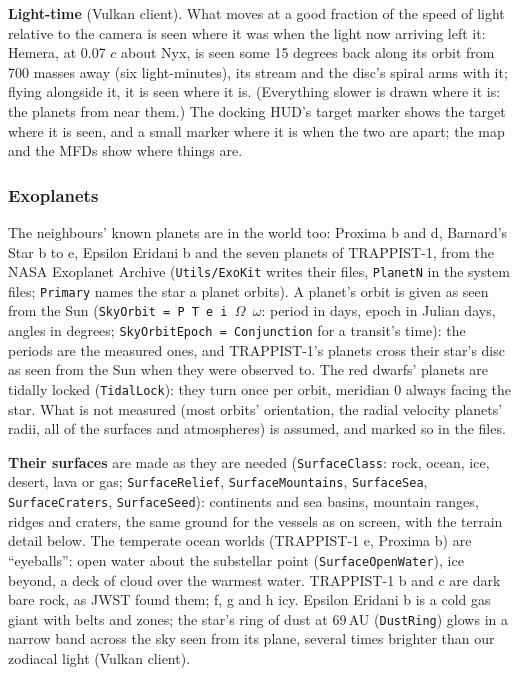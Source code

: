 \documentclass[Orbiter User Manual.tex]{subfiles}
\begin{document}
\textbf{Light-time} (Vulkan client). What moves at a good fraction of the speed of light relative to the camera is seen where it was when the light now arriving left it: Hemera, at 0.07 $c$ about Nyx, is seen some 15 degrees back along its orbit from 700 masses away (six light-minutes), its stream and the disc's spiral arms with it; flying alongside it, it is seen where it is. (Everything slower is drawn where it is: the planets from near them.) The docking HUD's target marker shows the target where it is seen, and a small marker where it is when the two are apart; the map and the MFDs show where things are.

\subsubsection{Exoplanets}
The neighbours' known planets are in the world too: Proxima b and d, Barnard's Star b to e, Epsilon Eridani b and the seven planets of TRAPPIST-1, from the NASA Exoplanet Archive (\texttt{Utils/ExoKit} writes their files, \texttt{PlanetN} in the system files; \texttt{Primary} names the star a planet orbits). A planet's orbit is given as seen from the Sun (\texttt{SkyOrbit = P T e i $\Omega$ $\omega$}: period in days, epoch in Julian days, angles in degrees; \texttt{SkyOrbitEpoch = Conjunction} for a transit's time): the periods are the measured ones, and TRAPPIST-1's planets cross their star's disc as seen from the Sun when they were observed to. The red dwarfs' planets are tidally locked (\texttt{TidalLock}): they turn once per orbit, meridian 0 always facing the star. What is not measured (most orbits' orientation, the radial velocity planets' radii, all of the surfaces and atmospheres) is assumed, and marked so in the files.

\textbf{Their surfaces} are made as they are needed (\texttt{SurfaceClass}: rock, ocean, ice, desert, lava or gas; \texttt{SurfaceRelief}, \texttt{SurfaceMountains}, \texttt{SurfaceSea}, \texttt{SurfaceCraters}, \texttt{SurfaceSeed}): continents and sea basins, mountain ranges, ridges and craters, the same ground for the vessels as on screen, with the terrain detail below. The temperate ocean worlds (TRAPPIST-1 e, Proxima b) are ``eyeballs'': open water about the substellar point (\texttt{SurfaceOpenWater}), ice beyond, a deck of cloud over the warmest water. TRAPPIST-1 b and c are dark bare rock, as JWST found them; f, g and h icy. Epsilon Eridani b is a cold gas giant with belts and zones; the star's ring of dust at 69\,AU (\texttt{DustRing}) glows in a narrow band across the sky seen from its plane, several times brighter than our zodiacal light (Vulkan client).
\end{document}
